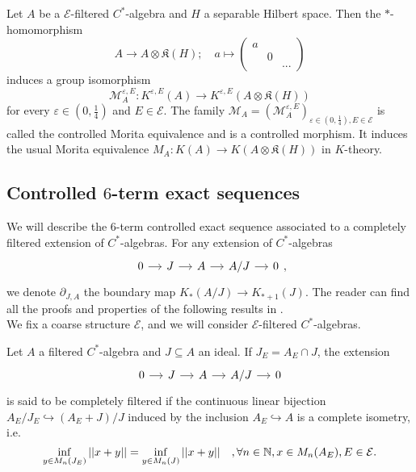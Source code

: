 \begin{prop}
Let $A$ be a $\mathcal E$-filtered $C^*$-algebra and $H$ a separable Hilbert space. Then the $*$-homomorphism
\[A\rightarrow A\otimes \mathfrak K(H) ; \quad a\mapsto 
\begin{pmatrix}a & & \\  & 0 & \\ & & ... \end{pmatrix}\]
induces a group isomorphism 
\[\mathcal M_A^{\varepsilon,E} : K^{\varepsilon,E}(A)\rightarrow K^{\varepsilon,E}(A\otimes \mathfrak K(H)) \]
for every $\varepsilon\in(0,\frac{1}{4})$ and $E\in\mathcal E$. The family $\mathcal M_A = (\mathcal M_A^{\varepsilon,E} )_{\varepsilon\in(0,\frac{1}{4}),E\in\mathcal E}$ is called the controlled Morita equivalence and is a controlled morphism. It induces the usual Morita equivalence $M_A: K(A)\rightarrow K(A\otimes \mathfrak K(H))$ in $K$-theory. 
\end{prop}

\subsection{Controlled $6$-term exact sequences}

We will describe the $6$-term controlled exact sequence associated to a completely filtered extension of $C^*$-algebras. For any extension of $C^*$-algebras 
\[\begin{tikzcd}[column sep = small]0\arrow{r} & J\arrow{r} & A\arrow{r} & A/J\arrow{r} & 0 \end{tikzcd},\]
we denote $\partial_{J,A}$ the boundary map $K_*(A/J)\rightarrow K_{*+1}(J)$. The reader can find all the proofs and properties of the following results in \cite{OY2}.\\

We fix a coarse structure $\mathcal E$, and we will consider $\mathcal E$-filtered $C^*$-algebras.

\begin{definition}
Let $A$ a filtered $C^*$-algebra and $J\subseteq A$ an ideal. If $J_E = A_E\cap J$, the extension
\[\begin{tikzcd}[column sep = small]0\arrow{r} & J\arrow{r} & A\arrow{r} & A/J\arrow{r} & 0 \end{tikzcd}\]
is said to be completely filtered if the continuous linear bijection $A_E/J_E \hookrightarrow (A_E+J)/J$ induced by the inclusion $A_E\hookrightarrow A$ is a complete isometry, i.e.
\[ \inf_{y\in M_n(J_E)} ||x+y|| = \inf_{y\in M_n(J)} ||x+y||\quad,\forall n\in \mathbb N,x\in M_n(A_E),E\in \mathcal E.\]
\end{definition}


